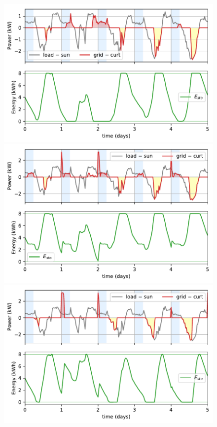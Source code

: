 \documentclass[a4paper,10pt,twocolumn]{article}
\begin{document}
\begin{figure}
  \begin{center}
    \includegraphics[width=1\columnwidth]{figures/matlab_rule-based.pdf}
    \includegraphics[width=1\columnwidth]{figures/matlab_mpc.pdf}
    \includegraphics[width=1\columnwidth]{figures/julia_anticipative.pdf}
  \end{center}


\end{figure}
\end{document}
